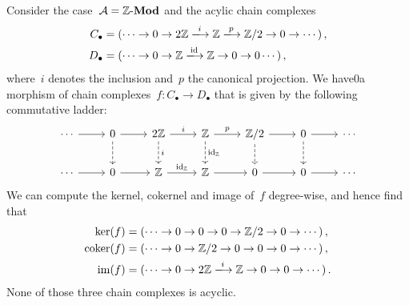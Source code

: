 \subsection{}

Consider the case~$\mathcal{A} = \text{$\mathbb{Z}$-$\mathbf{Mod}$}$ and the acylic chain complexes
\begin{align*}
      C_\bullet
  &=  (
        \dotsb
        \to
        0
        \to
        2 \Integer
        \xlongto{i}
        \Integer
        \xlongto{p}
        \Integer/2
        \to
        0
        \to
        \dotsb
      ) \,,
  \\
      D_\bullet
  &=  (
        \dotsb
        \to
        0
        \to
        \Integer
        \xlongto{\id}
        \Integer
        \to
        0
        \to
        0
        \dotsb
      ) \,,
\end{align*}
where~$i$ denotes the inclusion and~$p$ the canonical projection.
We have0a morphism of chain complexes~$f \colon C_\bullet \to D_\bullet$ that is given by the following commutative ladder:
\[
  \begin{tikzcd}
      \dotsb
      \arrow{r}
    & 0
      \arrow{r}
      \arrow[dashed]{d}
    & 2\Integer
      \arrow{r}[above]{i}
      \arrow[dashed]{d}[right]{i}
    & \Integer
      \arrow{r}[above]{p}
      \arrow[dashed]{d}{\id_\Integer}
    & \Integer/2
      \arrow{r}
      \arrow[dashed]{d}
    & 0
      \arrow{r}
      \arrow[dashed]{d}
    & \dotsb
    \\
      \dotsb
      \arrow{r}
    & 0
      \arrow{r}
    & \Integer
      \arrow{r}[above]{\id_\Integer}
    & \Integer
      \arrow{r}
    & 0
      \arrow{r}
    & 0
      \arrow{r}
    & \dotsb
  \end{tikzcd}
\]
We can compute the kernel, cokernel and image of~$f$ degree-wise, and hence find that
\begin{align*}
      \ker(f)
  &=  (
        \dotsb
        \to
        0
        \to
        0
        \to
        0
        \to
        \Integer/2
        \to
        0
        \to
        \dotsb
      ) \,,
  \\
      \coker(f)
  &=  (
        \dotsb
        \to
        0
        \to
        \Integer/2
        \to
        0
        \to
        0
        \to
        0
        \to
        \dotsb
      ) \,,
  \\
      \im(f)
  &=  (
        \dotsb
        \to
        0
        \to
        2\Integer
        \xlongto{i}
        \Integer
        \to
        0
        \to
        0
        \to
        \dotsb
      ) \,.
\end{align*}
None of those three chain complexes is acyclic.




